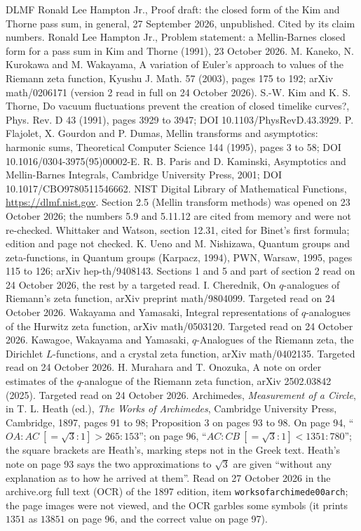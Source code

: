 \documentclass[11pt]{article}
\begin{document}
{\small\sloppy
\begin{thebibliography}{DLMF}
 Ronald Lee Hampton Jr., Proof draft: the closed form of the Kim and Thorne pass sum, in general, 27 September 2026, unpublished. Cited by its claim numbers.
 Ronald Lee Hampton Jr., Problem statement: a Mellin-Barnes closed form for a pass sum in Kim and Thorne (1991), 23 October 2026.
 M. Kaneko, N. Kurokawa and M. Wakayama, A variation of Euler's approach to values of the Riemann zeta function, Kyushu J. Math. 57 (2003), pages 175 to 192; arXiv math/0206171 (version 2 read in full on 24 October 2026).
 S.-W. Kim and K. S. Thorne, Do vacuum fluctuations prevent the creation of closed timelike curves?, Phys. Rev. D 43 (1991), pages 3929 to 3947; DOI 10.1103/PhysRevD.43.3929.
 P. Flajolet, X. Gourdon and P. Dumas, Mellin transforms and asymptotics: harmonic sums, Theoretical Computer Science 144 (1995), pages 3 to 58; DOI 10.1016/0304-3975(95)00002-E.
 R. B. Paris and D. Kaminski, Asymptotics and Mellin-Barnes Integrals, Cambridge University Press, 2001; DOI 10.1017/CBO9780511546662.
 NIST Digital Library of Mathematical Functions, \url{https://dlmf.nist.gov}. Section 2.5 (Mellin transform methods) was opened on 23 October 2026; the numbers 5.9 and 5.11.12 are cited from memory and were not re-checked.
 Whittaker and Watson, section 12.31, cited for Binet's first formula; edition and page not checked.
 K. Ueno and M. Nishizawa, Quantum groups and zeta-functions, in Quantum groups (Karpacz, 1994), PWN, Warsaw, 1995, pages 115 to 126; arXiv hep-th/9408143. Sections 1 and 5 and part of section 2 read on 24 October 2026, the rest by a targeted read.
 I. Cherednik, On $q$-analogues of Riemann's zeta function, arXiv preprint math/9804099. Targeted read on 24 October 2026.
 Wakayama and Yamasaki, Integral representations of $q$-analogues of the Hurwitz zeta function, arXiv math/0503120. Targeted read on 24 October 2026.
 Kawagoe, Wakayama and Yamasaki, $q$-Analogues of the Riemann zeta, the Dirichlet $L$-functions, and a crystal zeta function, arXiv math/0402135. Targeted read on 24 October 2026.
 H. Murahara and T. Onozuka, A note on order estimates of the $q$-analogue of the Riemann zeta function, arXiv 2502.03842 (2025). Targeted read on 24 October 2026.
 Archimedes, \emph{Measurement of a Circle}, in T. L. Heath (ed.), \emph{The Works of Archimedes}, Cambridge University Press, Cambridge, 1897, pages 91 to 98; Proposition 3 on pages 93 to 98. On page 94, ``$OA:AC\ [=\sqrt3:1]>265:153$''; on page 96, ``$AC:CB\ [=\sqrt3:1]<1351:780$''; the square brackets are Heath's, marking steps not in the Greek text. Heath's note on page 93 says the two approximations to $\sqrt3$ are given ``without any explanation as to how he arrived at them''. Read on 27 October 2026 in the archive.org full text (OCR) of the 1897 edition, item \texttt{worksofarchimede00arch}; the page images were not viewed, and the OCR garbles some symbols (it prints $1351$ as $13851$ on page 96, and the correct value on page 97).

\end{thebibliography}}
\end{document}

